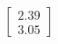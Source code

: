 \documentclass[preview]{standalone}
\begin{document}
\begin{align*}
\begin{bmatrix} 2.39 \\ 3.05 \end{bmatrix}
\end{align*}
\end{document}
